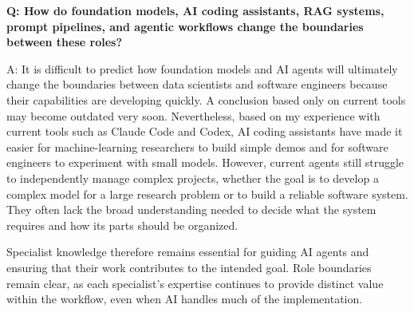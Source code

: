 \noindent\textbf{Q: How do foundation models, AI coding assistants, RAG systems, prompt pipelines, and agentic workflows change the boundaries between these
roles? }

A: 
It is difficult to predict how foundation models and AI agents will ultimately change the boundaries between data scientists and software engineers because their capabilities are developing quickly. A conclusion based only on current tools may become outdated very soon. Nevertheless, based on my experience with current tools such as Claude Code and Codex, AI coding assistants have made it easier for machine-learning researchers to build simple demos and for software engineers to experiment with small models. However, current agents still struggle to independently manage complex projects, whether the goal is to develop a complex model for a large research problem or to build a reliable software system. They often lack the broad understanding needed to decide what the system requires and how its parts should be organized.

Specialist knowledge therefore remains essential for guiding AI agents and ensuring that their work contributes to the intended goal. Role boundaries remain clear, as each specialist’s expertise continues to provide distinct value within the workflow, even when AI handles much of the implementation.